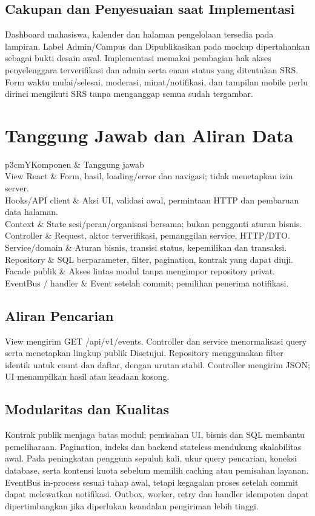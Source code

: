 \documentclass[11pt,a4paper]{article}
\newcommand{\tbl}[2]{\par\smallskip\noindent\begin{tabularx}{\linewidth}{#1}\toprule #2\bottomrule\end{tabularx}\par\smallskip}
\newcommand{\page}[1]{\clearpage\section{#1}}
\begin{document}
\subsection{Cakupan dan Penyesuaian saat Implementasi}
Dashboard mahasiswa, kalender dan halaman pengelolaan tersedia pada lampiran. Label Admin/Campus dan Dipublikasikan pada mockup dipertahankan sebagai bukti desain awal. Implementasi memakai pembagian hak akses penyelenggara terverifikasi dan admin serta enam status yang ditentukan SRS. Form waktu mulai/selesai, moderasi, minat/notifikasi, dan tampilan mobile perlu dirinci mengikuti SRS tanpa menganggap semua sudah tergambar.
\page{Tanggung Jawab dan Aliran Data}
\tbl{p{3cm}Y}{Komponen & Tanggung jawab\\\midrule
View React & Form, hasil, loading/error dan navigasi; tidak menetapkan izin server.\\
Hooks/API client & Aksi UI, validasi awal, permintaan HTTP dan pembaruan data halaman.\\
Context & State sesi/peran/organisasi bersama; bukan pengganti aturan bisnis.\\
Controller & Request, aktor terverifikasi, pemanggilan service, HTTP/DTO.\\
Service/domain & Aturan bisnis, transisi status, kepemilikan dan transaksi.\\
Repository & SQL berparameter, filter, pagination, kontrak yang dapat diuji.\\
Facade publik & Akses lintas modul tanpa mengimpor repository privat.\\
EventBus / handler & Event setelah commit; pemilihan penerima notifikasi.\\}
\subsection{Aliran Pencarian}
View mengirim GET /api/v1/events. Controller dan service menormalisasi query serta menetapkan lingkup publik Disetujui. Repository menggunakan filter identik untuk count dan daftar, dengan urutan stabil. Controller mengirim JSON; UI menampilkan hasil atau keadaan kosong.
\subsection{Modularitas dan Kualitas}
Kontrak publik menjaga batas modul; pemisahan UI, bisnis dan SQL membantu pemeliharaan. Pagination, indeks dan backend stateless mendukung skalabilitas awal. Pada peningkatan pengguna sepuluh kali, ukur query pencarian, koneksi database, serta kontensi kuota sebelum memilih caching atau pemisahan layanan.
EventBus in-process sesuai tahap awal, tetapi kegagalan proses setelah commit dapat melewatkan notifikasi. Outbox, worker, retry dan handler idempoten dapat dipertimbangkan jika diperlukan keandalan pengiriman lebih tinggi.
\end{document}
